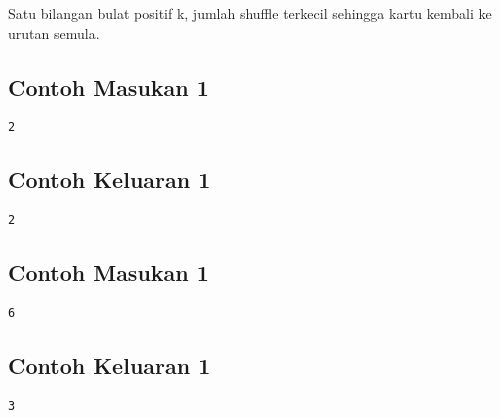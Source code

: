 \documentclass{article}
\begin{document}
Satu bilangan bulat positif k, jumlah shuffle terkecil sehingga kartu kembali ke urutan semula.

\begin{multicols}{2}
\subsection*{Contoh Masukan 1}
\begin{lstlisting}
2
\end{lstlisting}
\columnbreak
\subsection*{Contoh Keluaran 1}
\begin{lstlisting}
2
\end{lstlisting}
\vfill
\null
\end{multicols}

\begin{multicols}{2}
\subsection*{Contoh Masukan 1}
\begin{lstlisting}
6
\end{lstlisting}
\columnbreak
\subsection*{Contoh Keluaran 1}
\begin{lstlisting}
3
\end{lstlisting}
\vfill
\null
\end{multicols}
\end{document}

